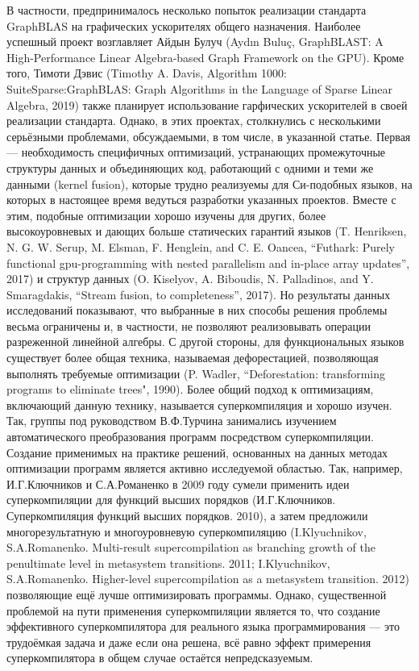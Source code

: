 \documentclass[12pt]{article}  %
\theoremstyle{remark}
\begin{document}
В частности, предпринималось несколько попыток реализации стандарта GraphBLAS на графических ускорителях общего назначения. Наиболее успешный проект возглавляет Айдын Булуч (Aydın Buluç, GraphBLAST: A High-Performance Linear Algebra-based Graph Framework on the GPU). Кроме того, Тимоти Дэвис (Timothy A. Davis, Algorithm 1000: SuiteSparse:GraphBLAS: Graph Algorithms in the Language of Sparse Linear Algebra, 2019) также планирует использование гарфических ускорителей в своей реализации стандарта. Однако, в этих проектах,  столкнулись с несколькими серьёзными проблемами, обсуждаемыми, в том числе, в указанной статье. Первая --- необходимость специфичных оптимизаций, устранающих промежуточные структуры данных и объединяющих код, работающий с одними и теми же данными (kernel fusion), которые трудно реализуемы для Си-подобных языков, на которых в настоящее время ведуться разработки указанных проектов. Вместе с этим, подобные оптимизации хорошо изучены для других, более высокоуровневых и дающих больше статических гарантий языков (T. Henriksen, N. G. W. Serup, M. Elsman, F. Henglein, and C. E. Oancea, “Futhark: Purely functional gpu-programming with nested parallelism and in-place array updates”, 2017) и структур данных (O. Kiselyov, A. Biboudis, N. Palladinos, and Y. Smaragdakis, “Stream fusion, to completeness”, 2017). Но результаты данных исследований показывают, что выбранные в них способы решения проблемы весьма ограничены и, в частности, не позволяют реализовывать операции разреженной линейной алгебры. С другой стороны, для функциональных языков существует более общая техника, называемая 	дефорестацией, позволяющая выполнять требуемые оптимизации (P. Wadler, “Deforestation: transforming programs to eliminate trees", 1990). Более общий подход к оптимизациям, включающий данную технику, называется суперкомпиляция и хорошо изучен. Так, группы под руководством В.Ф.Турчина занимались изучением автоматического преобразования программ посредством суперкомпиляции. Создание применимых на практике решений, основанных на данных методах оптимизации программ является активно исследуемой областью. Так, например, И.Г.Ключников и С.А.Романенко в 2009 году сумели применить идеи суперкомпиляции для функций высших порядков (И.Г.Ключников. Суперкомпиляция функций высших порядков. 2010), а затем предложили многорезультатную и многоуровневую суперкомпиляцию (I.Klyuchnikov, S.A.Romanenko. Multi-result supercompilation as branching growth of the penultimate level in metasystem transitions. 2011; I.Klyuchnikov, S.A.Romanenko. Higher-level supercompilation as a metasystem transition. 2012) позволяющие ещё лучше оптимизировать программы. Однако, существенной проблемой на пути применения суперкомпиляции является то, что создание эффективного суперкомпилятора для реального языка программирования --- это трудоёмкая задача и даже если она решена, всё равно эффект примерения суперкомпилятора в общем случае остаётся непредсказуемым. 
\end{document}

